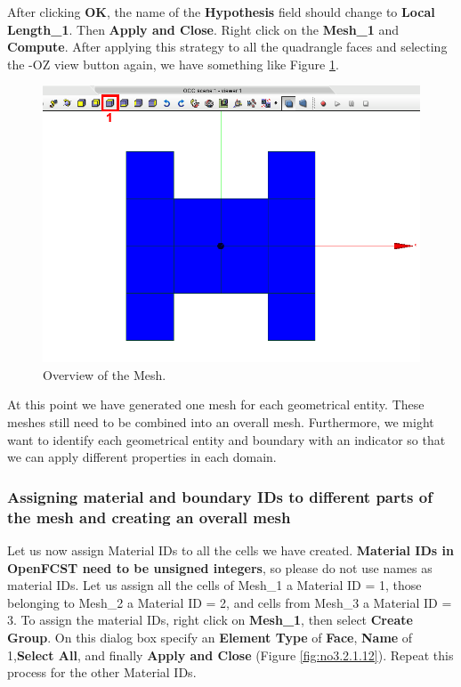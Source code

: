 After clicking \textbf{OK}, the name of the \textbf{Hypothesis} field should change to \textbf{Local Length\_1}. Then \textbf{Apply and Close}. Right click on the \textbf{Mesh\_1} and \textbf{Compute}. After applying this strategy to all the quadrangle faces and selecting the -OZ view button again, we have something like Figure \ref{fig:no3.2.1.11}.

\begin{figure}[tbp]
\begin{center}
\includegraphics[scale=0.60]{figures/SalomeStep3c.png}
\caption{Overview of the Mesh.}
\label{fig:no3.2.1.11}
\end{center}
\end{figure}

At this point we have generated one mesh for each geometrical entity. These meshes still need to be combined into an overall mesh. Furthermore, we might want to identify each geometrical entity and boundary with an indicator so that we can apply different properties in each domain.

\subsubsection{Assigning material and boundary IDs to different parts of the mesh and creating an overall mesh}

Let us now assign Material IDs to all the cells we have created. \textbf{Material IDs in OpenFCST need to be unsigned integers}, so please do not use names as material IDs. Let us assign all the cells of Mesh\_1 a Material ID = 1, those belonging to Mesh\_2 a Material ID = 2, and cells from Mesh\_3 a Material ID = 3. To assign the material IDs, right click on \textbf{Mesh\_1}, then select \textbf{Create Group}. On this dialog box specify an \textbf{Element Type} of \textbf{Face}, \textbf{Name} of 1,\textbf{Select All}, and finally \textbf{Apply and Close} (Figure \ref{fig:no3.2.1.12}). Repeat this process for the other Material IDs.

